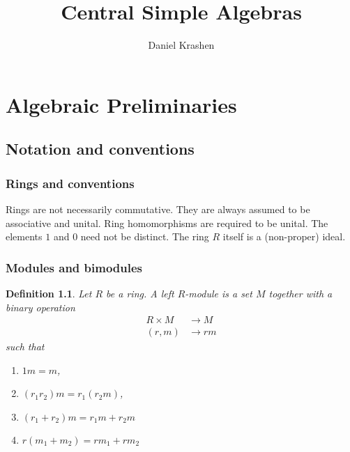 \documentclass[12pt]{report}
\theoremstyle{plain}
\newtheorem{defn}[thm]{Definition}
\begin{document}


\author{Daniel Krashen}
\title{Central Simple Algebras}

\maketitle
\tableofcontents



\chapter{Algebraic Preliminaries}

\section{Notation and conventions}

\subsection{Rings and conventions}

Rings are not necessarily commutative. They are always assumed to be
associative and unital. Ring homomorphisms are required to be unital. The
elements $1$ and $0$ need not be distinct. The ring $R$ itself is a
(non-proper) ideal.

\subsection{Modules and bimodules}

\begin{defn}
Let $R$ be a ring. A left $R$-module is a set $M$ together with a binary
operation
\begin{align*}
R \times M &\to M \\
(r, m) &\to rm
\end{align*}
such that
\begin{enumerate}[1. ]
\item $1 m = m$, 
\item $(r_1 r_2) m = r_1 (r_2 m)$, 
\item $(r_1 + r_2)m = r_1m + r_2 m$
\item $r(m_1 + m_2) = rm_1 + rm_2$
\end{enumerate}
\end{defn}
\end{document}

